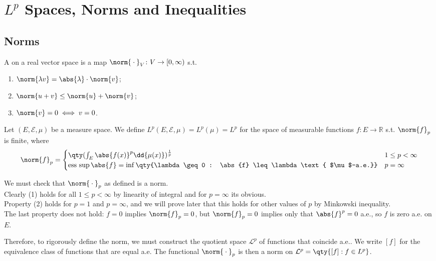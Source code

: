 \section{$L^p$ Spaces, Norms and Inequalities}
\subsection{Norms}
\begin{definition}[Norm]
	A  on a real vector space is a map $\norm{\wildcard}_V \colon V \to \mathbb [0, \infty)$ s.t.
	\begin{enumerate}
		\item $\norm{\lambda v} = \abs{\lambda} \cdot \norm{v}$;
		\item $\norm{u + v} \leq \norm{u} + \norm{v}$;
		\item $\norm{v} = 0 \iff v = 0$.
	\end{enumerate}
\end{definition}

\begin{definition}
	Let $(E, \mathcal E, \mu)$ be a measure space.
	We define $L^p(E,\mathcal E,\mu) = L^p(\mu) = L^p$ for the space of measurable functions $f \colon E \to \mathbb R$ s.t. $\norm{f}_p$ is finite, where
	\[ \norm{f}_p = \begin{cases}
		\qty(\int_E \abs{f(x)}^p \dd{\mu(x)})^{\frac{1}{p}} & 1 \leq p < \infty \\
		\esssup \abs{f} = \inf \qty{\lambda \geq 0 : \abs{f} \leq \lambda \text{ $\mu$-a.e.}} & p = \infty
	\end{cases} \]
\end{definition}

We must check that $\norm{\wildcard}_p$ as defined is a norm. \\
Clearly (1) holds for all $1 \leq p < \infty$ by linearity of integral and for $p = \infty$ its obvious. \\
Property (2) holds for $p = 1$ and $p = \infty$, and we will prove later that this holds for other values of $p$ by Minkowski inequality. \\
The last property does not hold: $f = 0$ implies $\norm{f}_p = 0$, but $\norm{f}_p = 0$ implies only that $\abs{f}^p = 0$ a.e., so $f$ is zero a.e. on $E$.

Therefore, to rigorously define the norm, we must construct the quotient space $\mathcal L^p$ of functions that coincide a.e..
We write $[f]$ for the equivalence class of functions that are equal a.e.
The functional $\norm{\wildcard}_p$ is then a norm on $\mathcal L^p = \qty{[f] : f \in L^p}$.

